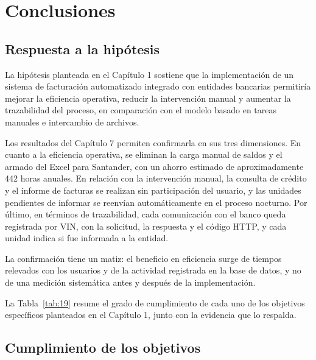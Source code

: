 \section{Conclusiones}

\subsection{Respuesta a la hipótesis}

La hipótesis planteada en el Capítulo 1 sostiene que la implementación de un sistema de facturación automatizado integrado con entidades bancarias permitiría mejorar la eficiencia operativa, reducir la intervención manual y aumentar la trazabilidad del proceso, en comparación con el modelo basado en tareas manuales e intercambio de archivos.

Los resultados del Capítulo 7 permiten confirmarla en sus tres dimensiones. En cuanto a la eficiencia operativa, se eliminan la carga manual de saldos y el armado del Excel para Santander, con un ahorro estimado de aproximadamente 442 horas anuales. En relación con la intervención manual, la consulta de crédito y el informe de facturas se realizan sin participación del usuario, y las unidades pendientes de informar se reenvían automáticamente en el proceso nocturno. Por último, en términos de trazabilidad, cada comunicación con el banco queda registrada por VIN, con la solicitud, la respuesta y el código HTTP, y cada unidad indica si fue informada a la entidad.

La confirmación tiene un matiz: el beneficio en eficiencia surge de tiempos relevados con los usuarios y de la actividad registrada en la base de datos, y no de una medición sistemática antes y después de la implementación.

La Tabla~\ref{tab:19} resume el grado de cumplimiento de cada uno de los objetivos específicos planteados en el Capítulo 1, junto con la evidencia que lo respalda.

\subsection{Cumplimiento de los objetivos}

